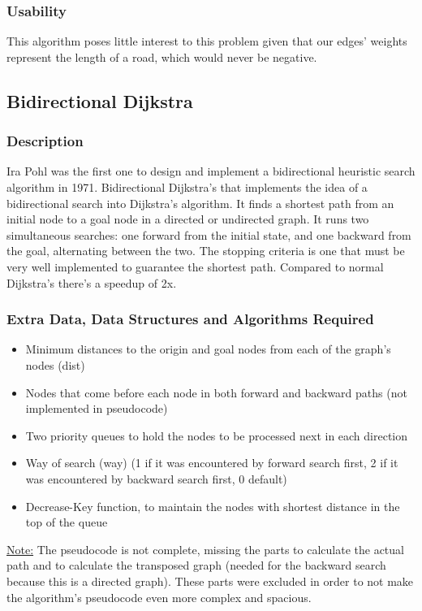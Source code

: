 \subsubsection{Usability}
This algorithm poses little interest to this problem given that our edges' weights represent the length of a road, which would never be negative. 


\subsection{Bidirectional Dijkstra}

\subsubsection{Description}
Ira Pohl was the first one to design and implement a bidirectional heuristic search algorithm in 1971. 
Bidirectional Dijkstra's that implements the idea of a bidirectional search into Dijkstra's algorithm. It finds a shortest path from an initial node to a goal node in a directed or undirected graph. It runs two simultaneous searches: one forward from the initial state, and one backward from the goal, alternating between the two. The stopping criteria is one that must be very well implemented to guarantee the shortest path. Compared to normal Dijkstra's there's a speedup of 2x.

\subsubsection{Extra Data, Data Structures and Algorithms Required}
\begin{itemize}
    \item Minimum distances to the origin and goal nodes from each of the graph's nodes (dist)
    \item Nodes that come before each node in both forward and backward paths (not implemented in pseudocode)
    \item Two priority queues to hold the nodes to be processed next in each direction
    \item Way of search (way) (1 if it was encountered by forward search first, 2 if it was encountered by backward search first, 0 default)
    \item Decrease-Key function, to maintain the nodes with shortest distance in the top of the queue
\end{itemize}


\uline{Note:} The pseudocode is not complete, missing the parts to calculate the actual path and to calculate the transposed graph (needed for the backward search because this is a directed graph). These parts were excluded in order to not make the algorithm's pseudocode even more complex and spacious.

